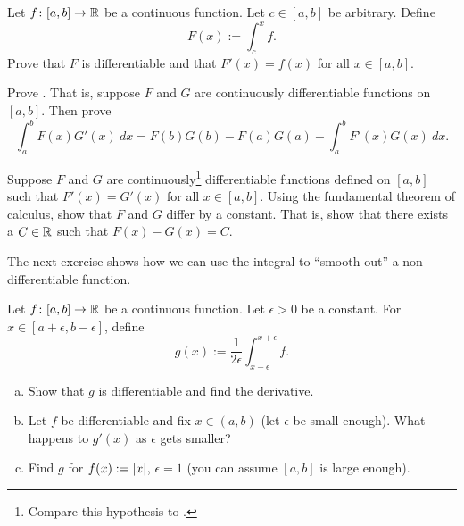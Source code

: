 \begin{exercise} \label{secondftc:exercise}
Let $f \colon [a,b] \to {\mathbb{R}}$ be a continuous function.  Let $c \in [a,b]$
be arbitrary.  Define
\begin{equation*}
F(x) := \int_c^x f .
\end{equation*}
Prove that $F$ is differentiable and that $F'(x) = f(x)$ for all $x \in
[a,b]$.
\end{exercise}

\begin{exercise}
Prove \emph{}.  That is, suppose $F$ and
$G$ are continuously differentiable functions on $[a,b]$.  Then prove
\begin{equation*}
\int_a^b F(x)G'(x)~dx
=
F(b)G(b)-F(a)G(a)
-
\int_a^b F'(x)G(x)~dx .
\end{equation*}
\end{exercise}

\begin{exercise}
Suppose $F$ and $G$ are
continuously\footnote{
Compare this hypothesis to .}
differentiable
functions defined on $[a,b]$
such that $F'(x) = G'(x)$ for all $x \in [a,b]$.
Using the fundamental theorem of calculus,
show that $F$ and $G$ differ by a constant.  That is, show that
there exists a $C \in {\mathbb{R}}$ such that
$F(x)-G(x) = C$.
\end{exercise}

\begin{exnote}
The next exercise shows how we can use the integral to ``smooth out'' a
non-differentiable function.
\end{exnote}

\begin{exercise} \label{exercise:smoothingout}
Let $f \colon [a,b] \to {\mathbb{R}}$ be a continuous function.  Let $\epsilon > 0$
be a constant.  For $x \in [a+\epsilon,b-\epsilon]$, define
\begin{equation*}
g(x) := \frac{1}{2\epsilon} \int_{x-\epsilon}^{x+\epsilon} f .
\end{equation*}
\begin{enumerate}[a)]
\item
Show that $g$ is differentiable and find the derivative.
\item
Let $f$ be differentiable and fix $x \in (a,b)$ (let $\epsilon$
be small enough).  What happens to $g'(x)$ as $\epsilon$ gets smaller?
\item
Find $g$ for $f(x) := \left\lvert {x} \right\rvert$, $\epsilon = 1$ (you can assume 
$[a,b]$ is large enough).
\end{enumerate}
\end{exercise}


